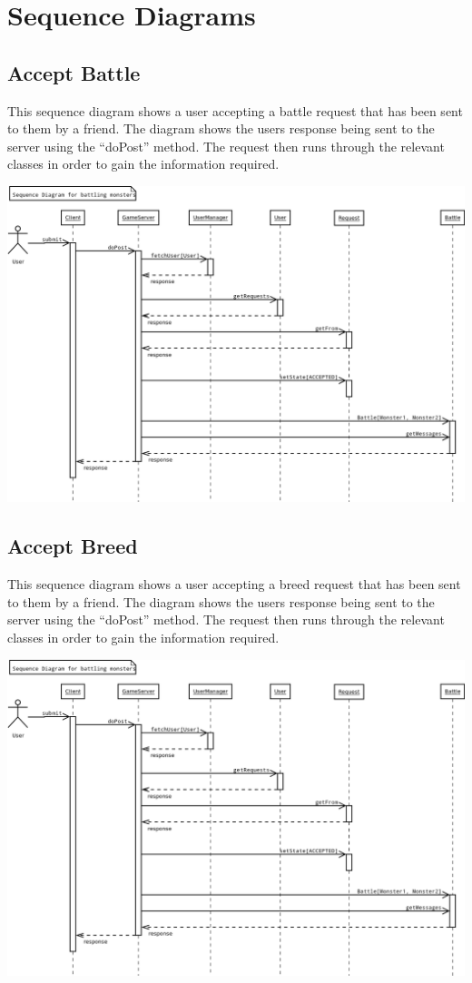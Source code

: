 \documentclass{project}
\begin{document}
\section{Sequence Diagrams}
\subsection{Accept Battle}
This sequence diagram shows a user accepting a battle request that has been sent to them by a friend. The diagram shows the users response being sent to the server using the “doPost” method. The request then runs through the relevant classes in order to gain the information required.
\begin{center}
\includegraphics[scale=0.40]{SD_accept_battle.png}
\end{center}

\subsection{Accept Breed}
This sequence diagram shows a user accepting a breed request that has been sent to them by a friend. The diagram shows the users response being sent to the server using the “doPost” method. The request then runs through the relevant classes in order to gain the information required.
\begin{center}
\includegraphics[scale=0.40]{SD_accept_breed.png}
\end{center}
\end{document}
